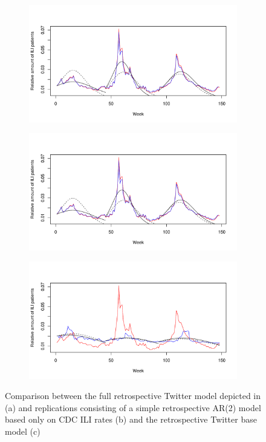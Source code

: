 \documentclass[11pt, a4paper,twoside]{report}\usepackage[]{graphicx}\usepackage[]{color}
\begin{document}
\begin{figure}[H]
\centering
  \begin{subfigure}[t]{0.65\textwidth}
  \includegraphics[width=1\linewidth,height=0.5\linewidth]{SIR_model_full_both_25_colorised.pdf}
  \caption{}
  \label{fig:TwitterModel_comparison_original}
  \end{subfigure}
  
  \begin{subfigure}[t]{0.6\textwidth}
  \includegraphics[width=1\linewidth,height=0.5\linewidth]{SIR_model_full_AR2_100_colorised.pdf}
  \caption{}
  \label{fig:TwitterModel_comparison_base_model}
  \end{subfigure}
  
  \begin{subfigure}[t]{0.6\textwidth}
  \includegraphics[width=1\linewidth,height=0.5\linewidth]{SIR_model_full_base_model_100_colorised.pdf}
  \caption{}
  \label{fig:TwitterModel_comparison_AR2}
  \end{subfigure}
  \caption{Comparison between the full retrospective Twitter model depicted in \citep{bodnar_data_2015} (a) and replications consisting of a simple retrospective AR(2) model based only on CDC ILI rates (b) and the retrospective Twitter base model (c)}
  \label{fig:TwitterModel_comparison}
\end{figure}
\end{document}
